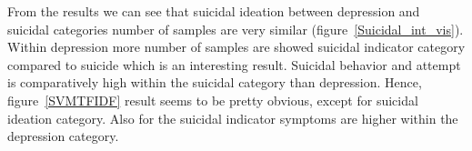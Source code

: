\documentclass[sn-mathphys,Numbered]{sn-jnl}%
\theoremstyle{thmstyleone}%
\theoremstyle{thmstyletwo}%
\theoremstyle{thmstylethree}%
\begin{document}


From the results we can see that suicidal ideation between depression and suicidal categories number of samples are very similar (figure~\ref{Suicidal_int_vis}). Within depression more number of samples are showed suicidal indicator category compared to suicide which is an interesting result. Suicidal behavior and attempt is comparatively high within the suicidal category than depression. Hence, figure~\ref{SVMTFIDF} result seems to be pretty obvious, except for suicidal ideation category. Also for the suicidal indicator symptoms are higher within the depression category. 
\end{document}
